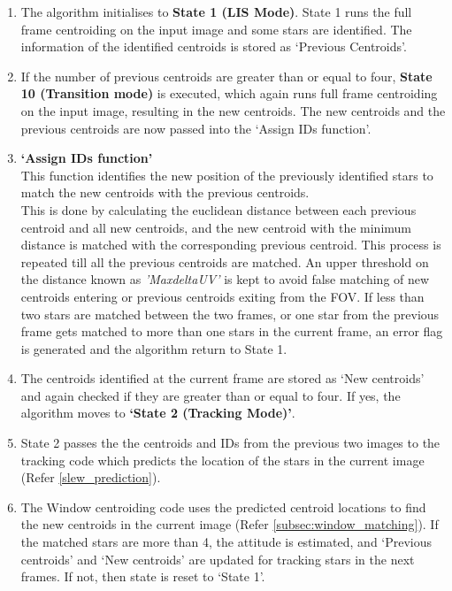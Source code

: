 \documentclass[../../main.tex]{subfiles}
\begin{document}
\begin{enumerate}
    \item The algorithm initialises to \textbf{State 1 (LIS Mode)}. State 1 runs the full frame centroiding on the input image and some stars are identified. The information of the identified centroids is stored as `Previous Centroids'. 
    \item If the number of previous centroids are greater than or equal to four, \textbf{State 10 (Transition mode)} is executed, which again runs full frame centroiding on the input image, resulting in the new centroids. The new centroids and the previous centroids are now passed into the `Assign IDs function'. 
    \item \textbf{`Assign IDs function'} \\
    This function identifies the new position of the previously identified stars to match the new centroids with the previous centroids. \\
    This is done by calculating the euclidean distance between each previous centroid and all new centroids, and the new centroid with the minimum distance is matched with the corresponding previous centroid. This process is repeated till all the previous centroids are matched.
    An upper threshold on the distance known as \emph{'MaxdeltaUV'} is kept to avoid false matching of new centroids entering or previous centroids exiting from the FOV. If less than two stars are matched between the two frames, or one star from the previous frame gets matched to more than one stars in the current frame, an error flag is generated and the algorithm return to State 1. 
    \item The centroids identified at the current frame are stored as `New centroids' and again checked if they are greater than or equal to four. If yes, the algorithm moves to \textbf{`State 2 (Tracking Mode)'}.
    \item State 2 passes the the centroids and IDs from the previous two images to the tracking code which predicts the location of the stars in the current image (Refer \ref{slew_prediction}). 
    \item The Window centroiding code uses the predicted centroid locations to find the new centroids in the current image (Refer \ref{subsec:window_matching}). If the matched stars are more than 4, the attitude is estimated, and `Previous centroids' and `New centroids' are updated for tracking stars in the next frames. If not, then state is reset to `State 1'. 
\end{enumerate}
\end{document}
